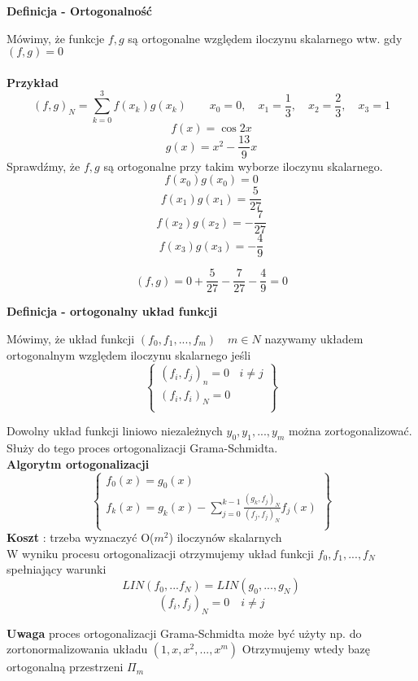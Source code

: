 \documentclass[polish]{kbk}
\begin{document}
\begin{center}
\textbf{Definicja - Ortogonalność}
\end{center}
Mówimy, że funkcje \(f,g\) są ortogonalne względem iloczynu skalarnego wtw. gdy \( (f,g) = 0 \) \\ \\
\textbf{Przykład} \\
$$ (f,g)_N = \sum_{k=0}^{3} f(x_k)g(x_k) \quad  \quad x_0 = 0,  \quad x_1 = \frac{1}{3},  \quad x_2 = \frac{2}{3},  \quad x_3 = 1 $$
$$ f(x) = \cos{2x} $$
$$ g(x) = x^2 - \frac{13}{9}x $$
Sprawdźmy, że \(f,g\) są ortogonalne przy takim wyborze iloczynu skalarnego.
$$ f(x_0)g(x_0) = 0 $$
$$ f(x_1)g(x_1) = \frac{5}{27} $$
$$ f(x_2)g(x_2) = - \frac{7}{27} $$
$$ f(x_3)g(x_3) = - \frac{4}{9} $$

$$(f,g) = 0 + \frac{5}{27}  - \frac{7}{27} - \frac{4}{9} = 0 $$


\begin{center}
\textbf{Definicja - ortogonalny układ funkcji}
\end{center}
Mówimy, że układ funkcji \( (f_0, f_1,..., f_m)  \quad m \in N \) nazywamy układem ortogonalnym względem iloczynu skalarnego jeśli
  \[
    \left\{\begin{array}{lr}
        (f_i, f_j)_n = 0 & i \neq j\\
        (f_i, f_i)_N = 0 \\
        \end{array}\right\} 
  \]
  
  Dowolny układ funkcji liniowo niezależnych \( y_0, y_1, ..., y_m\) można zortogonalizować. Służy do tego proces ortogonalizacji Grama-Schmidta.\\
  \textbf{Algorytm ortogonalizacji} \\
    \[
    \left\{\begin{array}{lr}
        f_0(x) = g_0(x) \\
        f_k(x) = g_k(x) -  \sum_{j=0}^{k-1}  \frac { (g_k, f_j)_N } { (f_j, f_j)_N } f_j(x)  \\
        \end{array}\right\} 
  \]
  \textbf{Koszt} : trzeba wyznaczyć O(\(m^2\)) iloczynów skalarnych \\
  
  W wyniku procesu ortogonalizacji otrzymujemy układ funkcji \(f_0, f_1, ... , f_N \) spełniający warunki
  $$ LIN ( f_0, ... f_N ) = LIN ( g_0,...,g_N )  $$
  $$ (f_i, f_j)_N = 0 \quad i \neq j $$
  
  \textbf{Uwaga} proces ortogonalizacji Grama-Schmidta może być użyty np. do zortonormalizowania układu \( (1,x, x^2, ... , x^m) \) Otrzymujemy wtedy bazę ortogonalną przestrzeni \( \Pi_m \) \\
  
\end{document}
